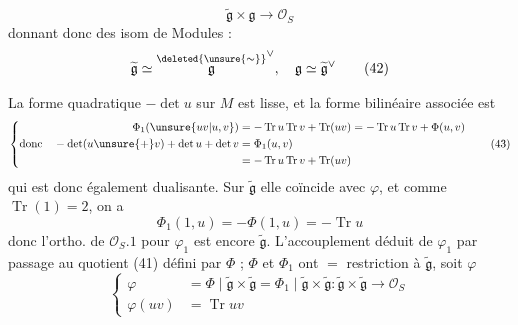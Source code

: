 \[
\widetilde{\mathfrak g}\times\mathfrak g\longrightarrow\mathcal O_S\tag*{(41)}
\]
donnant donc des isom de Modules :
\[
\widetilde{\mathfrak g}\simeq\overset{\deleted{\unsure{\sim}}}{\mathfrak g}^\vee,\quad\mathfrak g\simeq\widetilde{\mathfrak g}^{\vee}\tag*{(42)}
\]

La  forme quadratique  $-\det u$ sur $M$ est lisse, et la forme bilinéaire associée est
\[
\left\{\begin{aligned}
\Phi_1(\unsure{uv|u,v})&=-\operatorname{Tr}u\operatorname{Tr}v+\operatorname{Tr}(uv)=-\operatorname{Tr}u\operatorname{Tr}v+\Phi(u,v)\\
\text{donc}\quad-\det(u\unsure{+}v)+\det u+\det v&=\Phi_1(u,v)\\
&=-\operatorname{Tr}u\operatorname{Tr}v+\operatorname{Tr}(uv)
\end{aligned}\right.\tag*{(43)}
\]
qui est donc également dualisante. Sur $\widetilde{\mathfrak g}$ elle coïncide avec $\varphi$, et  comme $\operatorname{Tr}(1)=2$, on a
\[
\Phi_1(1,u)=-\Phi(1,u)=-\operatorname{Tr}u
\]
donc l'ortho. de $\mathcal O_S.1$ pour $\varphi_1$ est encore $\widetilde{\mathfrak g}$. L'accouplement   déduit de $\varphi_1$ par passage au quotient   (41) défini par $\Phi$ ;    $\Phi$ et $\Phi_1$ ont $=$ restriction à $\widetilde{\mathfrak g}$, soit $\varphi$
\[
\left\{\begin{aligned}
\varphi&=\Phi\mid\widetilde{\mathfrak g}\times\widetilde{\mathfrak g}
=\Phi_1\mid\widetilde{\mathfrak g}\times\widetilde{\mathfrak g}
:\widetilde{\mathfrak g}\times\widetilde{\mathfrak g}\to\mathcal O_S\\
\varphi(uv)&=\operatorname{Tr}uv
\end{aligned}\right.\tag*{(42)}
\]
